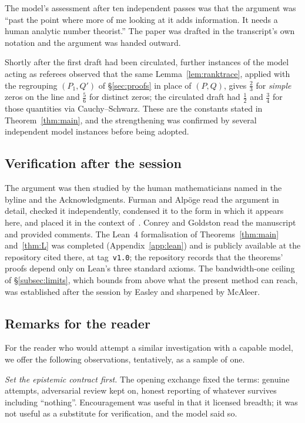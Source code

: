 \documentclass[11pt]{amsart}
\newcommand{\repoTag}{v1.0}
\theoremstyle{definition}
\theoremstyle{remark}
\numberwithin{equation}{section}
\begin{document}
The model's assessment after ten independent passes was that the argument was ``past the point where more of me looking at it adds information. It needs a human analytic number theorist.'' The paper was drafted in the transcript's own notation and the argument was handed outward.

Shortly after the first draft had been circulated, further instances of the model acting as referees observed that the same Lemma~\ref{lem:ranktrace}, applied with the regrouping $(P_1,Q')$ of \S\ref{sec:proofs} in place of $(P,Q)$, gives $\tfrac23$ for \emph{simple} zeros on the line and $\tfrac56$ for distinct zeros; the circulated draft had $\tfrac12$ and $\tfrac34$ for those quantities via Cauchy--Schwarz. These are the constants stated in Theorem~\ref{thm:main}, and the strengthening was confirmed by several independent model instances before being adopted.

\subsection{Verification after the session}\label{app:afterward}

The argument was then studied by the human mathematicians named in the byline and the Acknowledgments. Furman and Alp\"oge read the argument in detail, checked it independently, condensed it to the form in which it appears here, and placed it in the context of~\cite{Ary22,BGSTB24,GS25,GS26}. Conrey and Goldston read the manuscript and provided comments. The Lean~4 formalisation of Theorems~\ref{thm:main} and~\ref{thm:L} was completed (Appendix~\ref{app:lean}) and is publicly available at the repository cited there, at tag~\texttt{\repoTag}; the repository records that the theorems' proofs depend only on Lean's three standard axioms. The bandwidth-one ceiling of \S\ref{subsec:limits}, which bounds from above what the present method can reach, was established after the session by Easley and sharpened by McAleer.

\subsection{Remarks for the reader}\label{app:remarks}

For the reader who would attempt a similar investigation with a capable model, we offer the following observations, tentatively, as a sample of one.

\emph{Set the epistemic contract first.} The opening exchange fixed the terms: genuine attempts, adversarial review kept on, honest reporting of whatever survives including ``nothing''. Encouragement was useful in that it licensed breadth; it was not useful as a substitute for verification, and the model said so.
\end{document}

